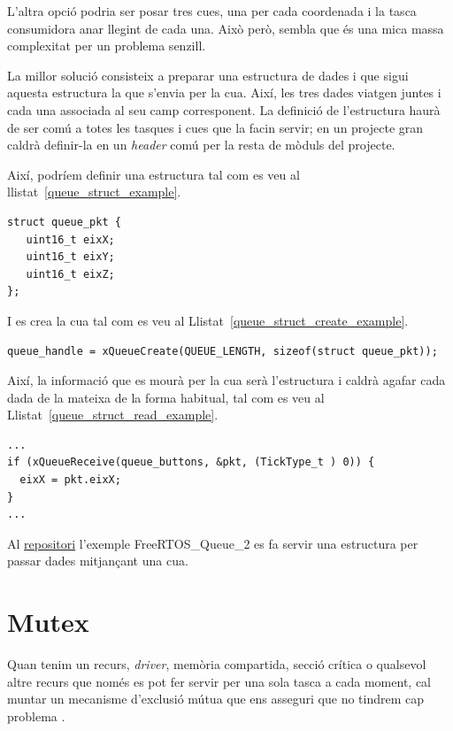L'altra opció podria ser posar tres cues, una per cada coordenada i la tasca consumidora anar llegint de cada una. Això però, sembla que és una mica massa complexitat per un problema senzill.

La millor solució consisteix a preparar una estructura de dades i que sigui aquesta estructura la que s'envia per la cua. Així, les tres dades viatgen juntes i cada una associada al seu camp corresponent. La definició de l'estructura haurà de ser comú a totes les tasques i cues que la facin servir; en un projecte gran caldrà definir-la en un {\em header} comú per la resta de mòduls del projecte.

Així, podríem definir una estructura tal com es veu al llistat~\ref{queue_struct_example}.

\begin{lstlisting}[style=customc, label=queue_struct_example, caption=Paquet dins d'estructura,floatplacement=h! ]
struct queue_pkt {
   uint16_t eixX;
   uint16_t eixY;
   uint16_t eixZ;
};
\end{lstlisting}

I es crea la cua tal com es veu al Llistat~\ref{queue_struct_create_example}.

\begin{lstlisting}[style=customc, label=queue_struct_create_example, caption=Creació de la cua amb un paquet de dades,floatplacement=h!]
queue_handle = xQueueCreate(QUEUE_LENGTH, sizeof(struct queue_pkt));
\end{lstlisting}


Així, la informació que es mourà per la cua serà l'estructura i caldrà agafar cada dada de la mateixa de la forma habitual, tal com es veu al Llistat~\ref{queue_struct_read_example}.

\begin{lstlisting}[style=customc, label=queue_struct_read_example, caption=Rebre un paquet de dades de la cua]
...
if (xQueueReceive(queue_buttons, &pkt, (TickType_t ) 0)) {
  eixX = pkt.eixX;
}
...
\end{lstlisting}

Al \href{https://github.com/mariusmm/cursembedded/tree/master/Simplicity/FreeRTOS_Queue_2}{repositori} l'exemple FreeRTOS\_Queue\_2 es fa servir una estructura per passar dades mitjançant una cua. 


\section{Mutex}
\label{sec:Mutex}
Quan tenim un recurs, {\em driver}, memòria compartida, secció crítica o qualsevol altre recurs que només es pot fer servir per una sola tasca a cada moment, cal muntar un mecanisme d'exclusió mútua que ens asseguri que no tindrem cap problema \cite[244]{FreeRTOSBook}.


